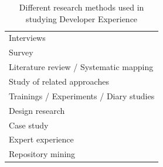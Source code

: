 \documentclass[english, 12pt, a4paper, sci, utf8, a-1b, online]{aaltothesis}
\begin{document}
\begin{table}[ht]
  \begin{center}
    \begin{tabular}{l}
      \hline
      Interviews                              \\
      Survey                                  \\
      Literature review / Systematic mapping  \\
      Study of related approaches             \\
      Trainings / Experiments / Diary studies \\
      Design research                         \\
      Case study                              \\
      Expert experience                       \\
      Repository mining                       \\
      \hline
    \end{tabular}
    \captionsetup{width=0.6\textwidth}
    \caption{Different research methods used in studying Developer Experience}
    \label{table:research-methods}
  \end{center}
\end{table}
\end{document}
